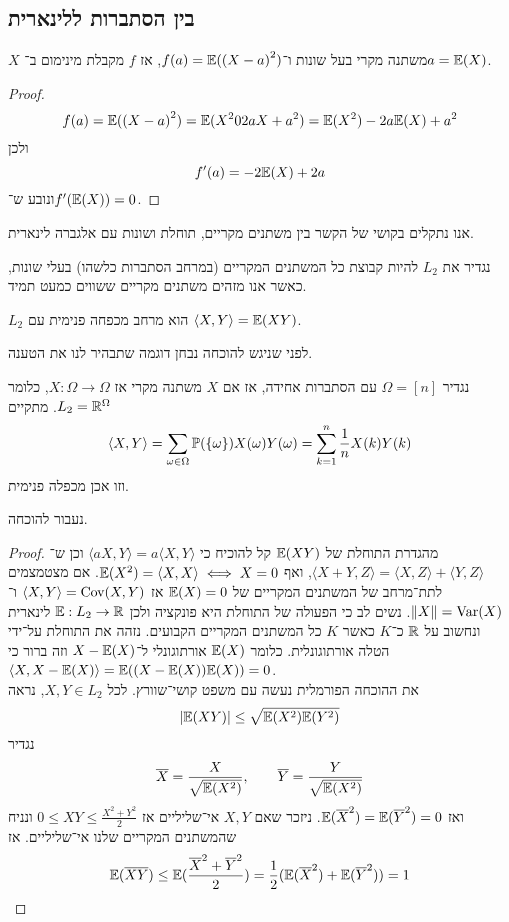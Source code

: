 \subsection{בין הסתברות ללינארית}
\begin{proposition}
	$X$ משתנה מקרי בעל שונות ו־$f(a) = \mathbb{E}({(X - a)}^2)$, אז $f$ מקבלת מינימום ב־$a = \mathbb{E}(X)$.
\end{proposition}
\begin{proof}
	\[
		f(a)
		= \mathbb{E}({(X - a)}^2)
		= \mathbb{E}(X^2 0 2a X + a^2)
		= \mathbb{E}(X^2) - 2a \mathbb{E}(X) + a^2
	\]
	ולכן
	\[
		f'(a)
		= -2 \mathbb{E}(X) + 2a
	\]
	ונובע ש־$f'(\mathbb{E}(X)) = 0$.
\end{proof}
אנו נתקלים בקושי של הקשר בין משתנים מקריים, תוחלת ושונות עם אלגברה לינארית.
\begin{definition}
	נגדיר את $L_2$ להיות קבוצת כל המשתנים המקריים (במרחב הסתברות כלשהו) בעלי שונות,
	כאשר אנו מזהים משתנים מקריים ששווים כמעט תמיד.
\end{definition}
\begin{proposition}
	$L_2$ הוא מרחב מכפחה פנימית עם $\langle X, Y \rangle = \mathbb{E}(XY)$.
\end{proposition}
לפני שניגש להוכחה נבחן דוגמה שתבהיר לנו את הטענה.
\begin{example}
	נגדיר $\Omega = [n]$ עם הסתברות אחידה, אז אם $X$ משתנה מקרי אז $X : \Omega \to \Omega$, כלומר $L_2 = \mathbb{R}^\Omega$.
	מתקיים
	\[
		\langle X, Y \rangle
		= \sum_{\omega \in \Omega} \mathbb{P}(\{\omega\}) X(\omega) Y(\omega)
		= \sum_{k = 1}^{n} \frac{1}{n} X(k) Y(k)
	\]
	וזו אכן מכפלה פנימית.
\end{example}
נעבור להוכחה.
\begin{proof}
	מהגדרת התוחלת של $\mathbb{E}(XY)$ קל להוכיח כי $\langle aX, Y \rangle = a \langle X, Y \rangle$ וכן ש־$\langle X + Y, Z \rangle = \langle X, Z \rangle + \langle Y, Z \rangle$,
	ואף $\mathbb{E}(X^2) = \langle X, X \rangle \iff X = 0$.
	אם מצטמצמים לתת־מרחב של המשתנים המקריים של $\mathbb{E}(X) = 0$ אז $\langle X, Y \rangle = \operatorname{Cov}(X, Y)$ ו־$\lVert X \rVert = \operatorname{Var}(X)$.
	נשים לב כי הפעולה של התוחלת היא פונקציה ולכן $\mathbb{E} : L_2 \to \mathbb{R}$ לינארית ונחשוב על $\mathbb{R}$ כ־$K$ כאשר $K$ כל המשתנים המקריים הקבועים.
	נזהה את התוחלת על־ידי הטלה אורתוגונלית. כלומר $\mathbb{E}(X)$ אורתוגונלי ל־$X - \mathbb{E}(X)$ וזה ברור כי $\langle X, X - \mathbb{E}(X) \rangle = \mathbb{E}((X - \mathbb{E}(X)) \mathbb{E}(X)) = 0$. \\
	את ההוכחה הפורמלית נעשה עם משפט קושי־שוורץ.
	לכל $X, Y \in L_2$, נראה
	\[
		|\mathbb{E}(XY)|
		\le \sqrt{\mathbb{E}(X^2) \mathbb{E}(Y^2)}
	\]
	נגדיר
	\[
		\overline{X} = \frac{X}{\sqrt{\mathbb{E}(X^2)}},
		\qquad
		\overline{Y} = \frac{Y}{\sqrt{\mathbb{E}(X^2)}}
	\]
	ואז $\mathbb{E}(\overline{X}^2) = \mathbb{E}(\overline{Y}^2) = 0$.
	ניזכר שאם $X, Y$ אי־שליליים אז $0 \le XY \le \frac{X^2 + Y^2}{2}$ ונניח שהמשתנים המקריים שלנו אי־שליליים.
	אז
	\[
		\mathbb{E}(\overline{X} \overline{Y})
		\le \mathbb{E}(\frac{\overline{X}^2 + \overline{Y}^2}{2})
		= \frac{1}{2}(\mathbb{E}(\overline{X}^2) + \mathbb{E}(\overline{Y}^2))
		= 1
	\]
\end{proof}

